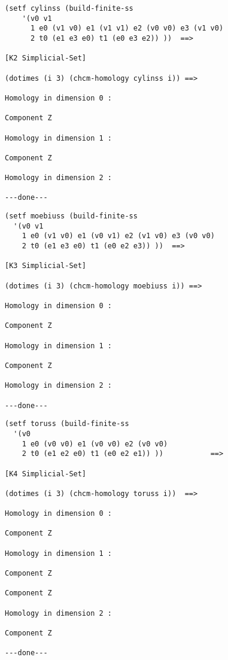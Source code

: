 {\footnotesize\begin{verbatim}
(setf cylinss (build-finite-ss 
    '(v0 v1 
      1 e0 (v1 v0) e1 (v1 v1) e2 (v0 v0) e3 (v1 v0)
      2 t0 (e1 e3 e0) t1 (e0 e3 e2)) ))  ==>

[K2 Simplicial-Set]

(dotimes (i 3) (chcm-homology cylinss i)) ==>

Homology in dimension 0 :

Component Z

Homology in dimension 1 :

Component Z

Homology in dimension 2 :

---done---
\end{verbatim}}
\newpage
%
\vskip 0.40cm
\centerline{}
\vskip 0.40cm
%
{\footnotesize\begin{verbatim}
(setf moebiuss (build-finite-ss 
  '(v0 v1 
    1 e0 (v1 v0) e1 (v0 v1) e2 (v1 v0) e3 (v0 v0)
    2 t0 (e1 e3 e0) t1 (e0 e2 e3)) ))  ==>

[K3 Simplicial-Set]

(dotimes (i 3) (chcm-homology moebiuss i)) ==>

Homology in dimension 0 :

Component Z

Homology in dimension 1 :

Component Z

Homology in dimension 2 :

---done---
\end{verbatim}}
\newpage
%
\vskip 0.40cm
\centerline{}
\vskip 0.40cm
%
{\footnotesize\begin{verbatim}
(setf toruss (build-finite-ss 
  '(v0
    1 e0 (v0 v0) e1 (v0 v0) e2 (v0 v0)
    2 t0 (e1 e2 e0) t1 (e0 e2 e1)) ))           ==>

[K4 Simplicial-Set]

(dotimes (i 3) (chcm-homology toruss i))  ==>

Homology in dimension 0 :

Component Z

Homology in dimension 1 :

Component Z

Component Z

Homology in dimension 2 :

Component Z

---done---
\end{verbatim}}
